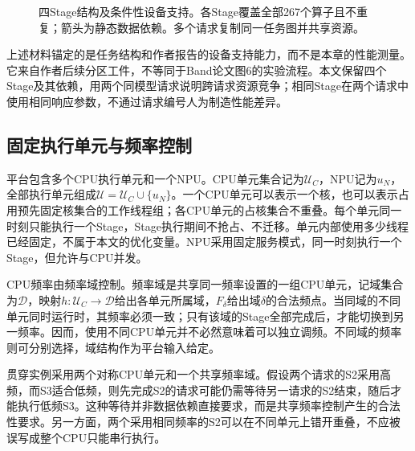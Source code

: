 \begin{figure}[htbp]
\centering
{}
\caption{四Stage结构及条件性设备支持。各Stage覆盖全部267个算子且不重复；箭头为静态数据依赖。多个请求复制同一任务图并共享资源。}
\label{fig:stage-structure}
\end{figure}


上述材料锚定的是任务结构和作者报告的设备支持能力，而不是本章的性能测量。它来自作者后续分区工件，不等同于Band论文图6的实验流程。本文保留四个Stage及其依赖，用两个同模型请求说明跨请求资源竞争；相同Stage在两个请求中使用相同响应参数，不通过请求编号人为制造性能差异。

\subsection{固定执行单元与频率控制}

平台包含多个CPU执行单元和一个NPU。CPU单元集合记为\(\mathcal U_C\)，NPU记为\(u_N\)，全部执行单元组成\(\mathcal U=\mathcal U_C\cup\{u_N\}\)。一个CPU单元可以表示一个核，也可以表示占用预先固定核集合的工作线程组；各CPU单元的占核集合不重叠。每个单元同一时刻只能执行一个Stage，Stage执行期间不抢占、不迁移。单元内部使用多少线程已经固定，不属于本文的优化变量。NPU采用固定服务模式，同一时刻执行一个Stage，但允许与CPU并发。

CPU频率由频率域控制。频率域是共享同一频率设置的一组CPU单元，记域集合为\(\mathcal D\)，映射\(h:\mathcal U_C\to\mathcal D\)给出各单元所属域，\(F_\delta\)给出域\(\delta\)的合法频点。当同域的不同单元同时运行时，其频率必须一致；只有该域的Stage全部完成后，才能切换到另一频率。因而，使用不同CPU单元并不必然意味着可以独立调频。不同域的频率则可分别选择，域结构作为平台输入给定。

贯穿实例采用两个对称CPU单元和一个共享频率域。假设两个请求的S2采用高频，而S3适合低频，则先完成S2的请求可能仍需等待另一请求的S2结束，随后才能执行低频S3。这种等待并非数据依赖直接要求，而是共享频率控制产生的合法性要求。另一方面，两个采用相同频率的S2可以在不同单元上错开重叠，不应被误写成整个CPU只能串行执行。

